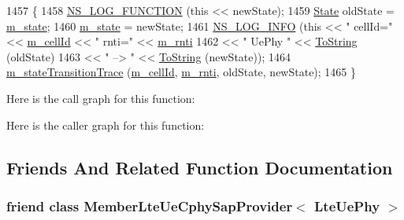 \begin{DoxyCode}
1457 \{
1458   \hyperlink{log-macros-disabled_8h_a90b90d5bad1f39cb1b64923ea94c0761}{NS\_LOG\_FUNCTION} (\textcolor{keyword}{this} << newState);
1459   \hyperlink{classns3_1_1LteUePhy_ae5118801f100c494663f0ca1e942aa31}{State} oldState = \hyperlink{classns3_1_1LteUePhy_a5a8bad2a7221da5f87727d53d58b481f}{m\_state};
1460   \hyperlink{classns3_1_1LteUePhy_a5a8bad2a7221da5f87727d53d58b481f}{m\_state} = newState;
1461   \hyperlink{group__logging_gafbd73ee2cf9f26b319f49086d8e860fb}{NS\_LOG\_INFO} (\textcolor{keyword}{this} << \textcolor{stringliteral}{" cellId="} << \hyperlink{classns3_1_1LtePhy_ac53d10d27f1bde64807a3ff366662787}{m\_cellId} << \textcolor{stringliteral}{" rnti="} << 
      \hyperlink{classns3_1_1LteUePhy_a887b5dc4e246a308cd09127b64ed8fac}{m\_rnti}
1462                     << \textcolor{stringliteral}{" UePhy "} << \hyperlink{namespacens3_a3d1f7e1bec1972e2ae8d64673fcfcd9c}{ToString} (oldState)
1463                     << \textcolor{stringliteral}{" --> "} << \hyperlink{namespacens3_a3d1f7e1bec1972e2ae8d64673fcfcd9c}{ToString} (newState));
1464   \hyperlink{classns3_1_1LteUePhy_ab86ca96c3346a3d9143e03faf4093f13}{m\_stateTransitionTrace} (\hyperlink{classns3_1_1LtePhy_ac53d10d27f1bde64807a3ff366662787}{m\_cellId}, \hyperlink{classns3_1_1LteUePhy_a887b5dc4e246a308cd09127b64ed8fac}{m\_rnti}, oldState, newState);
1465 \}
\end{DoxyCode}


Here is the call graph for this function\+:




Here is the caller graph for this function\+:




\subsection{Friends And Related Function Documentation}
\subsubsection[{\texorpdfstring{Member\+Lte\+Ue\+Cphy\+Sap\+Provider$<$ Lte\+Ue\+Phy $>$}{MemberLteUeCphySapProvider< LteUePhy >}}]{\setlength{\rightskip}{0pt plus 5cm}friend class {\bf Member\+Lte\+Ue\+Cphy\+Sap\+Provider}$<$ {\bf Lte\+Ue\+Phy} $>$\hspace{0.3cm}{\ttfamily [friend]}}\hypertarget{classns3_1_1LteUePhy_a116786bba3b875c3d4e2d82aa7dce360}{}\label{classns3_1_1LteUePhy_a116786bba3b875c3d4e2d82aa7dce360}
